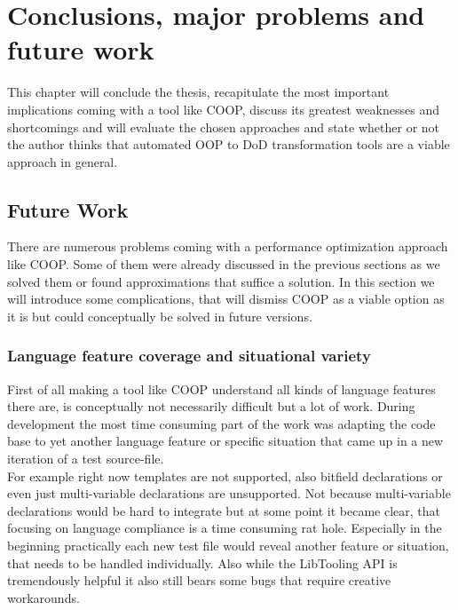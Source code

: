 \chapter{Conclusions, major problems and future work}
This chapter will conclude the thesis, recapitulate the most important implications coming with a tool like COOP, discuss its greatest weaknesses and shortcomings and will evaluate the chosen approaches and state whether or not the author thinks that automated OOP to DoD transformation tools are a viable approach in general.

\section{Future Work}\label{future_work}
There are numerous problems coming with a performance optimization approach like COOP. Some of them were already discussed in the previous sections as we solved them or found approximations that suffice a solution. In this section we will introduce some complications, that will dismiss COOP as a viable option as it is but could conceptually be solved in future versions.

\subsection{Language feature coverage and situational variety}
First of all making a tool like COOP understand all kinds of language features there are, is conceptually not necessarily difficult but a lot of work. During development the most time consuming part of the work was adapting the code base to yet another language feature or specific situation that came up in a new iteration of a test source-file.\\
For example right now templates are not supported, also bitfield declarations or even just multi-variable declarations are unsupported. Not because multi-variable declarations would be hard to integrate but at some point it became clear, that focusing on language compliance is a time consuming rat hole. Especially in the beginning practically each new test file would reveal another feature or situation, that needs to be handled individually. Also while the LibTooling API is tremendously helpful it also still bears some bugs that require creative workarounds.

